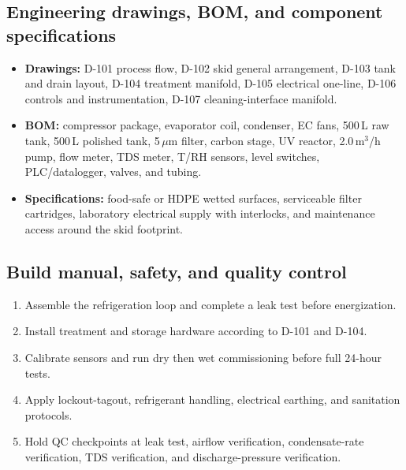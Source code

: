 \documentclass[11pt,a4paper]{article}
\begin{document}
\subsection{Engineering drawings, BOM, and component specifications}
\begin{itemize}[leftmargin=*]
  \item \textbf{Drawings:} D-101 process flow, D-102 skid general arrangement, D-103 tank and drain layout, D-104 treatment manifold, D-105 electrical one-line, D-106 controls and instrumentation, D-107 cleaning-interface manifold.
  \item \textbf{BOM:} compressor package, evaporator coil, condenser, EC fans, 500\,L raw tank, 500\,L polished tank, 5\,$\mu$m filter, carbon stage, UV reactor, 2.0\,m$^3$/h pump, flow meter, TDS meter, T/RH sensors, level switches, PLC/datalogger, valves, and tubing.
  \item \textbf{Specifications:} food-safe or HDPE wetted surfaces, serviceable filter cartridges, laboratory electrical supply with interlocks, and maintenance access around the skid footprint.
\end{itemize}

\subsection{Build manual, safety, and quality control}
\begin{enumerate}[leftmargin=*]
  \item Assemble the refrigeration loop and complete a leak test before energization.
  \item Install treatment and storage hardware according to D-101 and D-104.
  \item Calibrate sensors and run dry then wet commissioning before full 24-hour tests.
  \item Apply lockout-tagout, refrigerant handling, electrical earthing, and sanitation protocols.
  \item Hold QC checkpoints at leak test, airflow verification, condensate-rate verification, TDS verification, and discharge-pressure verification.
\end{enumerate}
\end{document}

